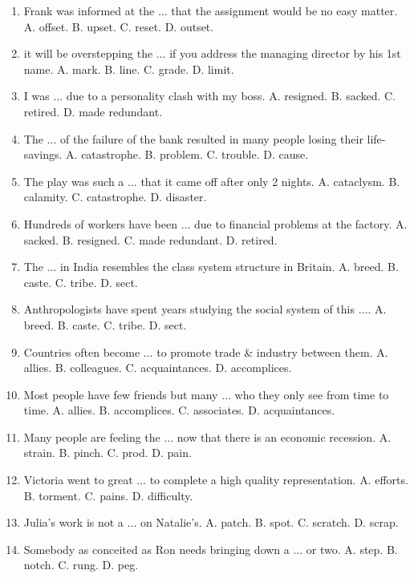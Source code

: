 \documentclass{article}
\numberwithin{equation}{section}
\begin{document}
\begin{enumerate}[leftmargin=8mm]
	\item Frank was informed at the $\ldots$ that the assignment would be no easy matter. {\sf A.} offset. {\sf B.} upset. {\sf C.} reset. {\sf D.} outset.
	\item it will be overstepping the $\ldots$ if you address the managing director by his 1st name. {\sf A.} mark. {\sf B.} line. {\sf C.} grade. {\sf D.} limit.
	\item I was $\ldots$ due to a personality clash with my boss. {\sf A.} resigned. {\sf B.} sacked. {\sf C.} retired. {\sf D.} made redundant.
	\item The $\ldots$ of the failure of the bank resulted in many people losing their life-savings. {\sf A.} catastrophe. {\sf B.} problem. {\sf C.} trouble. {\sf D.} cause.
	\item The play was such a $\ldots$ that it came off after only 2 nights. {\sf A.} cataclysm. {\sf B.} calamity. {\sf C.} catastrophe. {\sf D.} disaster.
	\item Hundreds of workers have been $\ldots$ due to financial problems at the factory. {\sf A.} sacked. {\sf B.} resigned. {\sf C.} made redundant. {\sf D.} retired.
	\item The $\ldots$ in India resembles the class system structure in Britain. {\sf A.} breed. {\sf B.} caste. {\sf C.} tribe. {\sf D.} sect.
	\item Anthropologists have spent years studying the social system of this $\ldots$. {\sf A.} breed. {\sf B.} caste. {\sf C.} tribe. {\sf D.} sect.
	\item Countries often become $\ldots$ to promote trade \& industry between them. {\sf A.} allies. {\sf B.} colleagues. {\sf C.} acquaintances. {\sf D.} accomplices.
	\item Most people have few friends but many $\ldots$ who they only see from time to time. {\sf A.} allies. {\sf B.} accomplices. {\sf C.} associates. {\sf D.} acquaintances.
	\item Many people are feeling the $\ldots$ now that there is an economic recession. {\sf A.} strain. {\sf B.} pinch. {\sf C.} prod. {\sf D.} pain.
	\item Victoria went to great $\ldots$ to complete a high quality representation. {\sf A.} efforts. {\sf B.} torment. {\sf C.} pains. {\sf D.} difficulty.
	\item Julia's work is not a $\ldots$ on Natalie's. {\sf A.} patch. {\sf B.} spot. {\sf C.} scratch. {\sf D.} scrap.
	\item Somebody as conceited as Ron needs bringing down a $\ldots$ or two. {\sf A.} step. {\sf B.} notch. {\sf C.} rung. {\sf D.} peg.

\end{enumerate}
\end{document}
